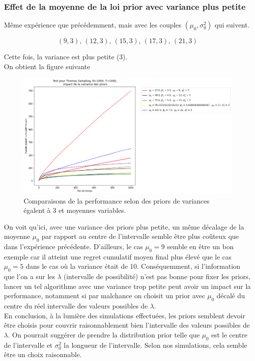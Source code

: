 \documentclass[letterpaper,11pt]{article}
\begin{document}
\subsubsection{Effet de la moyenne de la loi prior avec variance plus petite}

Même expérience que précédemment, mais avec les couples $(\mu_0,\sigma^2_0)$ qui suivent.

$$(9,3),\,(12,3),\,(15,3),\,(17,3),\,(21,3)$$

Cette fois, la variance est plus petite (3).\\

On obtient la figure suivante

\begin{figure}[H]
\label{figure: moyenne décalée 1}
\caption{Comparaisons de la performance selon des priors de variances égalent à 3 et moyennes variables.}
\begin{center}
\includegraphics[scale=0.5]{etude_moyenne_decale_var3.png} 
\end{center}
\end{figure}

On voit qu'ici, avec une variance des priors plus petite, un même décalage de la moyenne $\mu_0$ par rapport au centre de l'intervalle semble être plus coûteux que dans l'expérience précédente. D'ailleurs, le cas $\mu_0=9$ semble en être un bon exemple car il atteint une regret cumulatif moyen final plus élevé que le cas $\mu_0=5$ dans le cas où la variance était de 10. Conséquemment, si l'information que l'on a sur les $\lambda$ (intervalle de possibilité) n'est pas bonne pour fixer les priors, lancer un tel algorithme avec une variance trop petite peut avoir un impact sur la performance, notamment si par malchance on choisit un prior avec $\mu_0$ décalé du centre du réel intervalle des valeurs possibles de $\lambda.$\\

En conclusion, à la lumière des simulations effectuées, les priors semblent devoir être choisis pour couvrir raisonnablement bien l'intervalle des valeurs possibles de $\lambda.$ On pourrait suggérer de prendre la distribution prior telle que $\mu_0$ est le centre de l'intervalle et $\sigma^2_0$ la longueur de l'intervalle. Selon nos simulations, cela semble être un choix raisonnable.
\end{document}
